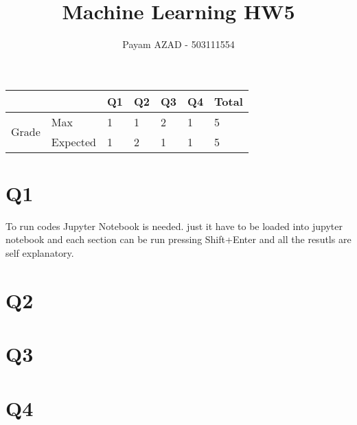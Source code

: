 \documentclass[11]{article}
\title{Machine Learning HW5}
\author{Payam AZAD - 503111554}
\begin{document}
 \maketitle
 
 \begin{table}[ht!]
\centering
\label{my-label}
\begin{tabular}{|ll|l|l|l|l|l|}
\hline
                                             &          & Q1 & Q2 & Q3 & Q4 & Total \\ \hline
\multicolumn{1}{|l|}{\multirow{2}{*}{Grade}} & Max      & 1  & 1 & 2 & 1 &  5     \\ \cline{2-6} 
\multicolumn{1}{|l|}{}                       & Expected & 1  & 2 & 1 & 1 &  5   \\ \hline
\end{tabular}
\end{table}


\section*{Q1}
To run codes Jupyter Notebook is needed. just it have to be loaded into jupyter notebook and each section can be run pressing Shift+Enter and all the resutls are self explanatory.

\section*{Q2}
 
\section*{Q3}



\section*{Q4}


 
\end{document}
